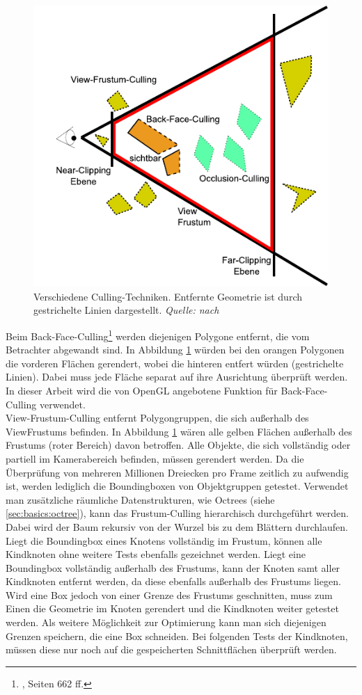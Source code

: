 \begin{figure}
  \centering
  \includegraphics[scale=0.8]{images/culling.pdf}
  \caption{Verschiedene Culling-Techniken. Entfernte Geometrie ist durch gestrichelte Linien dargestellt. \textit{Quelle: nach \cite{culling}} }
  \label{fig:basics:culling}
\end{figure}
Beim Back-Face-Culling\footnote{\cite{RTR3}, Seiten 662 ff.} werden diejenigen Polygone entfernt, die vom Betrachter abgewandt sind. In Abbildung \ref{fig:basics:culling} würden bei den orangen Polygonen die vorderen Flächen gerendert, wobei die hinteren entfert würden (gestrichelte Linien). Dabei muss jede Fläche separat auf ihre Ausrichtung überprüft werden. In dieser Arbeit wird die von OpenGL angebotene Funktion für Back-Face-Culling verwendet.\\
View-Frustum-Culling entfernt Polygongruppen, die sich außerhalb des ViewFrustums befinden. In Abbildung \ref{fig:basics:culling} wären alle gelben Flächen außerhalb des Frustums (roter Bereich) davon betroffen. Alle Objekte, die sich vollständig oder partiell im Kamerabereich befinden, müssen gerendert werden. Da die Überprüfung von mehreren Millionen Dreiecken pro Frame zeitlich zu aufwendig ist, werden lediglich die Boundingboxen von Objektgruppen getestet. Verwendet man zusätzliche räumliche Datenstrukturen, wie Octrees (siehe \ref{sec:basics:octree}), kann das Frustum-Culling hierarchisch durchgeführt werden. Dabei wird der Baum rekursiv von der Wurzel bis zu dem Blättern durchlaufen. Liegt die Boundingbox eines Knotens vollständig im Frustum, können alle Kindknoten ohne weitere Tests ebenfalls gezeichnet werden. Liegt eine Boundingbox vollständig außerhalb des Frustums, kann der Knoten samt aller Kindknoten entfernt werden, da diese ebenfalls außerhalb des Frustums liegen. Wird eine Box jedoch von einer Grenze des Frustums geschnitten, muss zum Einen die Geometrie im Knoten gerendert und die Kindknoten weiter getestet werden. Als weitere Möglichkeit zur Optimierung kann man sich diejenigen Grenzen speichern, die eine Box schneiden. Bei folgenden Tests der Kindknoten, müssen diese nur noch auf die gespeicherten Schnittflächen überprüft werden.\\
